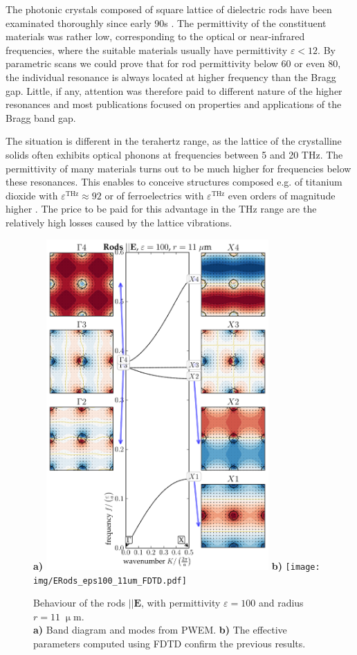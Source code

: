 \documentclass[letterpaper,12pt]{report}
\begin{document}
The photonic crystals composed of square lattice of dielectric rods have been examinated thoroughly since early 90s \cite{plihal1991two, pendry1992_transfer_matrix}. The permittivity of the constituent materials was rather low, corresponding to the optical or near-infrared frequencies, where the suitable materials usually have permittivity $\varepsilon < 12$. By parametric scans we could prove that for rod permittivity below 60 or even 80, the individual resonance is always located at higher frequency than the Bragg gap. Little, if any, attention was therefore paid to different nature of the higher resonances and most publications focused on properties and applications of the Bragg band gap.

The situation is different in the terahertz range, as the lattice of the crystalline solids often exhibits optical phonons at frequencies between 5 and 20 THz. The permittivity of many materials turns out to be much higher for frequencies below these resonances. This enables to conceive structures composed e.g. of titanium dioxide \cite{baumard1977_epsilon_TiO2} with $\varepsilon^{\text{THz}} \approx 92$ or of ferroelectrics with $\varepsilon^{\text{THz}}$ even orders of magnitude higher \cite{skoromets2011tuning}. The price to be paid for this advantage in the THz range are the relatively high losses caused by the lattice vibrations.


\begin{figure}[ht] \caption{Behaviour of the rods $||\mathbf E$, with permittivity $\varepsilon = 100$ and radius $r=11\;\upmu$m.\\
\textbf{a)} Band diagram and modes from PWEM. 
\textbf{b)} The effective parameters computed using FDTD confirm the previous results.  } \label{fg_erod_radius11} \centering 
\textbf{a)}	\includegraphics[width=8.5cm]{img/ERods_eps100_R11_PWEM.pdf}
\textbf{b)}	\texttt{[image: img/ERods\_eps100\_11um\_FDTD.pdf]}
\end{figure}
\end{document}
